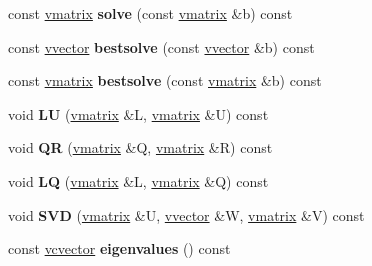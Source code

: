 \begin{DoxyCompactItemize}
\item 
const \hyperlink{classvmatrix}{vmatrix} {\bfseries solve} (const \hyperlink{classvmatrix}{vmatrix} \&b) const \hypertarget{classvmatrix_a4459130f66fdf5b95bdfff0e2c3de125}{}\label{classvmatrix_a4459130f66fdf5b95bdfff0e2c3de125}

\item 
const \hyperlink{classvvector}{vvector} {\bfseries bestsolve} (const \hyperlink{classvvector}{vvector} \&b) const \hypertarget{classvmatrix_a87e20cf889074e0a837c5e4d3d07410c}{}\label{classvmatrix_a87e20cf889074e0a837c5e4d3d07410c}

\item 
const \hyperlink{classvmatrix}{vmatrix} {\bfseries bestsolve} (const \hyperlink{classvmatrix}{vmatrix} \&b) const \hypertarget{classvmatrix_a48cddeca9d6137e69ce7891eb0fcfed6}{}\label{classvmatrix_a48cddeca9d6137e69ce7891eb0fcfed6}

\item 
void {\bfseries LU} (\hyperlink{classvmatrix}{vmatrix} \&L, \hyperlink{classvmatrix}{vmatrix} \&U) const \hypertarget{classvmatrix_a18c472413afad20cb1196f2820b77ea9}{}\label{classvmatrix_a18c472413afad20cb1196f2820b77ea9}

\item 
void {\bfseries QR} (\hyperlink{classvmatrix}{vmatrix} \&Q, \hyperlink{classvmatrix}{vmatrix} \&R) const \hypertarget{classvmatrix_a7a15bcb081426d442dc7862fd9f1c96f}{}\label{classvmatrix_a7a15bcb081426d442dc7862fd9f1c96f}

\item 
void {\bfseries LQ} (\hyperlink{classvmatrix}{vmatrix} \&L, \hyperlink{classvmatrix}{vmatrix} \&Q) const \hypertarget{classvmatrix_afcf0970f13aa85813529078c37774bf9}{}\label{classvmatrix_afcf0970f13aa85813529078c37774bf9}

\item 
void {\bfseries S\+VD} (\hyperlink{classvmatrix}{vmatrix} \&U, \hyperlink{classvvector}{vvector} \&W, \hyperlink{classvmatrix}{vmatrix} \&V) const \hypertarget{classvmatrix_ad2fe67f81e4b58f6020892be8cf241fa}{}\label{classvmatrix_ad2fe67f81e4b58f6020892be8cf241fa}

\item 
const \hyperlink{classvcvector}{vcvector} {\bfseries eigenvalues} () const \hypertarget{classvmatrix_a94ef8b57b64a07368a554634202f0532}{}\label{classvmatrix_a94ef8b57b64a07368a554634202f0532}

\end{DoxyCompactItemize}

